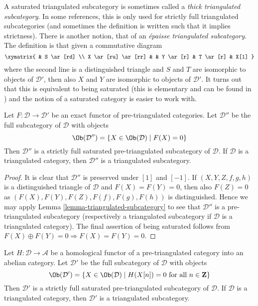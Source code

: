 \noindent
A saturated triangulated subcategory is sometimes called a
{\it thick triangulated subcategory}. In some references, this is
only used for strictly full triangulated subcategories (and sometimes
the definition is written such that it implies strictness).
There is another notion, that of an {\it \'epaisse triangulated
subcategory}. The definition is that given a commutative diagram
$$
\xymatrix{
& S \ar[rd] \\
X \ar[ru] \ar[rr] & & Y \ar[r] & T \ar[r] & X[1]
}
$$
where the second line is a distinguished triangle and $S$ and $T$ are isomorphic
to objects of $\mathcal{D}'$, then also $X$ and $Y$ are isomorphic to objects
of $\mathcal{D}'$. It turns out that this is equivalent to being
saturated (this is elementary and can be found in \cite{Rickard-derived})
and the notion of a saturated category is easier to work with.

\begin{lemma}
\label{lemma-triangle-functor-kernel}
Let $F : \mathcal{D} \to \mathcal{D}'$ be an exact functor of
pre-triangulated categories. Let $\mathcal{D}''$ be the full subcategory
of $\mathcal{D}$ with objects
$$
\Ob(\mathcal{D}'') =
\{X \in \Ob(\mathcal{D}) \mid F(X) = 0\}
$$
Then $\mathcal{D}''$ is a strictly full saturated pre-triangulated
subcategory of $\mathcal{D}$. If $\mathcal{D}$ is a triangulated category,
then $\mathcal{D}''$ is a triangulated subcategory.
\end{lemma}

\begin{proof}
It is clear that $\mathcal{D}''$ is preserved under $[1]$ and $[-1]$.
If $(X, Y, Z, f, g, h)$ is a distinguished triangle of $\mathcal{D}$
and $F(X) = F(Y) = 0$, then also $F(Z) = 0$ as
$(F(X), F(Y), F(Z), F(f), F(g), F(h))$ is distinguished.
Hence we may apply
Lemma \ref{lemma-triangulated-subcategory}
to see that $\mathcal{D}''$ is a pre-triangulated subcategory (respectively
a triangulated subcategory if $\mathcal{D}$ is a triangulated category).
The final assertion of being saturated follows from
$F(X) \oplus F(Y) = 0 \Rightarrow F(X) = F(Y) = 0$.
\end{proof}

\begin{lemma}
\label{lemma-homological-functor-kernel}
Let $H : \mathcal{D} \to \mathcal{A}$ be a homological functor of
a pre-triangulated category into an abelian category.
Let $\mathcal{D}'$ be the full subcategory of $\mathcal{D}$ with objects
$$
\Ob(\mathcal{D}') =
\{X \in \Ob(\mathcal{D}) \mid
H(X[n]) = 0\text{ for all }n \in \mathbf{Z}\}
$$
Then $\mathcal{D}'$ is a strictly full saturated pre-triangulated subcategory
of $\mathcal{D}$. If $\mathcal{D}$ is a triangulated category, then
$\mathcal{D}'$ is a triangulated subcategory.
\end{lemma}

